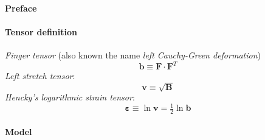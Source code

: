 \documentclass[garamond]{goose-article}
\newcommand\T[1]{\bm{{#1}}}
\begin{document}



\paragraph{Preface}


\paragraph{Tensor definition}

\emph{Finger tensor} (also known the name \emph{left Cauchy-Green deformation})
\begin{equation}
  \T{b} \equiv \T{F} \cdot \T{F}^T
\end{equation}
\emph{Left stretch tensor}:
\begin{equation}
  \T{v} \equiv \sqrt{\T{B}}
\end{equation}
\emph{Hencky’s logarithmic strain tensor}:
\begin{equation}
  \T{\varepsilon} \equiv \ln \T{v} = \tfrac{1}{2} \ln \T{b}
\end{equation}


\paragraph{Model}
\end{document}
